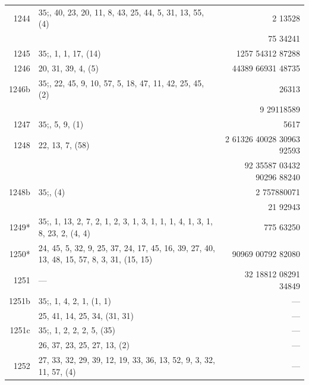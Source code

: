 \documentclass[11pt]{article}
\begin{document}
{\begin{longtable}{|r|p{8.5cm}|r|}
\hline
1244   & $35$;\; 19, 40, 23, 20, 11, 8, 43, 25, 44, 5, 31, 13, 55, (4) & 2 13528 \\
       & & 75 34241 \\
\hline
1245   & $35$;\; 3, 1, 1, 17, (14) & 1257 54312 87288 \\
1246   & 20, 31, 39, 4, (5) & 44389 66931 48735 \\
\hline
1246b  & $35$;\; 21, 22, 45, 9, 10, 57, 5, 18, 47, 11, 42, 25, 45, (2) & 26313 \\
       & & 9 29118589 \\
\hline
1247   & $35$;\; 3, 5, 9, (1) & 5617 \\
\hline
1248   & 22, 13, 7, (58) & 2 61326 40028 30963 92593 \\
       & & 92 35587 03432 90296 88240 \\
\hline
1248b  & $35$;\; 23, (4) & 2 757880071 \\
       & & 21 92943 \\
\hline
1249*  & $35$;\; 2, 1, 13, 2, 7, 2, 1, 2, 3, 1, 3, 1, 1, 1, 4, 1, 3, 1, 8, 23, 2, (4, 4) & 775 63250 \\
1250*  & 24, 45, 5, 32, 9, 25, 37, 24, 17, 45, 16, 39, 27, 40, 13, 48, 15, 57, 8, 3, 31, (15, 15) & 90969 00792 82080 \\
1251   & --- & 32 18812 08291 34849 \\
\hline
1251b  & $35$;\; 2, 1, 4, 2, 1, (1, 1) & --- \\
       & 25, 41, 14, 25, 34, (31, 31) & --- \\
\hline
1251c  & $35$;\; 2, 1, 2, 2, 2, 5, (35) & --- \\
       & 26, 37, 23, 25, 27, 13, (2) & --- \\
\hline
1252   & 27, 33, 32, 29, 39, 12, 19, 33, 36, 13, 52, 9, 3, 32, 11, 57, (4) & --- \\
\hline
\end{longtable}
}
\end{document}
